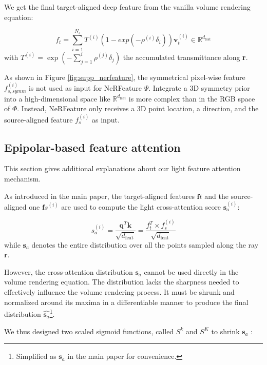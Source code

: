 We get the final target-aligned deep feature from the vanilla volume rendering equation:

\begin{equation}
\label{eq:ft_vr}
    f_{t} = \sum_{i=1}^{N_{s}} T^{(i)}(1-exp(-\rho^{(i)}\delta_{i}))\mathbf{v}_{t}^{(i)} \in \mathbb{R}^{d_{\text{feat}}}
\end{equation}
with $T^{(i)} = \exp\left(-\sum_{j=1}^{i}\rho^{(j)}\delta_{j}\right)$ the accumulated transmittance along \textbf{r}.

As shown in Figure \ref{fig:supp_nerfeature}, the symmetrical pixel-wise feature $f_{s,symm}^{(i)}$ is not used as input for NeRFeature $\Psi$. Integrate a 3D symmetry prior into a high-dimensional space like $\mathbb{R}^{d_{\text{feat}}}$ is more complex than in the RGB space of $\Phi$. Instead, NeRFeature only receives a 3D point location, a direction, and the source-aligned feature $f_{s}^{(i)}$ as input.

\subsection{Epipolar-based feature attention}
This section gives additional explanations about our light feature attention mechanism.

As introduced in the main paper, the target-aligned features $\mathbf{f}{t}$ and the source-aligned one $\mathbf{f}{s}^{(i)}$ are used to compute the light cross-attention score $\mathbf{s}_{a}^{(i)}$:

\begin{equation}
    s_{a}^{(i)} = \frac{\mathbf{q}^{T}\mathbf{k}}{\sqrt{d_{\text{feat}}}}= \frac{f_{t}^{T}\times f_{s}^{(i)}}{\sqrt{d_{\text{feat}}}}
\label{eq:attention}
\end{equation}
while $\mathbf{s}_{a}$ denotes the entire distribution over all the points sampled along the ray \textbf{r}.

However, the cross-attention distribution $\mathbf{s}_{a}$ cannot be used directly in the volume rendering equation. The distribution lacks the sharpness needed to effectively influence the volume rendering process. It must be shrunk and normalized around its maxima in a differentiable manner to produce the final distribution $\hat{\mathbf{s}_{a}}$\footnote{Simplified as $\mathbf{s}_{a}$ in the main paper for convenience.}.

We thus designed two scaled sigmoid functions, called $S^{k}$ and $S^{K}$ to shrink $\mathbf{s}_{a}$ : 

